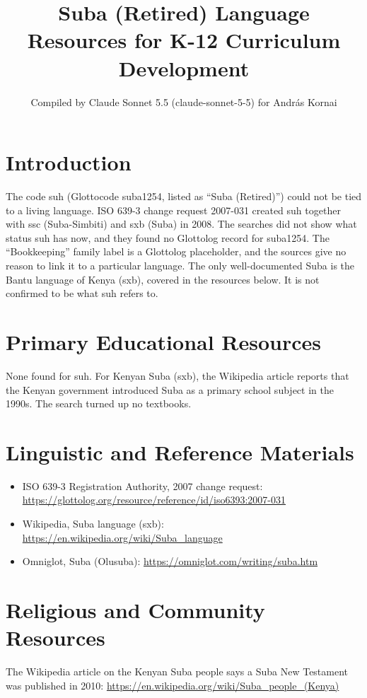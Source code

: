 \documentclass[12pt]{article}
\title{Suba (Retired) Language Resources for K-12 Curriculum Development}
\author{Compiled by Claude Sonnet 5.5 (claude-sonnet-5-5) for Andr\'as Kornai}
\date{}
\begin{document}
\maketitle

\section{Introduction}
The code suh (Glottocode suba1254, listed as ``Suba (Retired)'') could not be tied to a living language. ISO 639-3 change request 2007-031 created suh together with ssc (Suba-Simbiti) and sxb (Suba) in 2008. The searches did not show what status suh has now, and they found no Glottolog record for suba1254. The ``Bookkeeping'' family label is a Glottolog placeholder, and the sources give no reason to link it to a particular language. The only well-documented Suba is the Bantu language of Kenya (sxb), covered in the resources below. It is not confirmed to be what suh refers to.

\section{Primary Educational Resources}
None found for suh. For Kenyan Suba (sxb), the Wikipedia article reports that the Kenyan government introduced Suba as a primary school subject in the 1990s. The search turned up no textbooks.

\section{Linguistic and Reference Materials}
\begin{itemize}
\item ISO 639-3 Registration Authority, 2007 change request: \url{https://glottolog.org/resource/reference/id/iso6393:2007-031}
\item Wikipedia, Suba language (sxb): \url{https://en.wikipedia.org/wiki/Suba_language}
\item Omniglot, Suba (Olusuba): \url{https://omniglot.com/writing/suba.htm}
\end{itemize}

\section{Religious and Community Resources}
The Wikipedia article on the Kenyan Suba people says a Suba New Testament was published in 2010: \url{https://en.wikipedia.org/wiki/Suba_people_(Kenya)}
\end{document}
